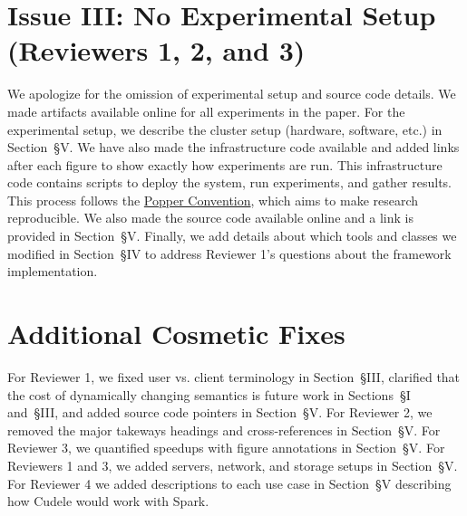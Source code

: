 \documentclass[onecolumn,conference]{IEEEtran}
\begin{document}
\section*{Issue III: No Experimental Setup (Reviewers 1, 2, and 3)}

We apologize for the omission of experimental setup and source code details.
We made artifacts available online for all experiments in the paper. For the
experimental setup, we describe the cluster setup (hardware, software, etc.) in
Section~{\S}V.  We have also made the infrastructure code available and added
links after each figure to show exactly how experiments are run.  This
infrastructure code contains scripts to deploy the system, run experiments, and
gather results.  This process follows the \href{http://falsifiable.us/}{Popper
Convention}, which aims to make research reproducible.  We also made the source
code available online and a link is provided in Section~{\S}V. Finally, we add
details about which tools and classes we modified in Section~{\S}IV to address
Reviewer 1's questions about the framework implementation.

\section*{Additional Cosmetic Fixes}

For Reviewer 1, we fixed user vs. client terminology in Section~{\S}III,
clarified that the cost of dynamically changing semantics is future work in
Sections~{\S}I and~{\S}III, and added source code pointers in Section~{\S}V.
For Reviewer 2, we removed the major takeways headings and cross-references in
Section~{\S}V. For Reviewer 3, we quantified speedups with figure annotations
in Section~{\S}V. For Reviewers 1 and 3, we added servers, network, and storage
setups in Section~{\S}V. For Reviewer 4 we added descriptions to each use case
in Section~{\S}V describing how Cudele would work with Spark.
\end{document}
